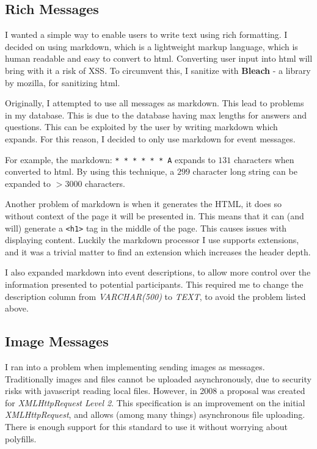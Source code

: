 \documentclass[a4paper,oneside,12pt]{report}
\begin{document}
	\subsection{Rich Messages}
	I wanted a simple way to enable users to write text using rich formatting. I decided on using markdown, which is a lightweight markup language, which is human readable and easy to convert to html. Converting user input into html will bring with it a risk of XSS. To circumvent this, I sanitize with \textbf{Bleach} - a library by mozilla, for sanitizing html.


	Originally, I attempted to use all messages as markdown. This lead to problems in my database. This is due to the database having max lengths for answers and questions. This can be exploited by the user by writing markdown which expands. For this reason, I decided to only use markdown for event messages.

	\begin{framed}
		For example, the markdown: \verb+* * * * * * A+ expands to \(131\) characters when converted to html. By using this technique, a \(299\) character long string can be expanded to \(> 3000\) characters.
	\end{framed}

	\lstset{language=html}
	Another problem of markdown is when it generates the HTML, it does so without context of the page it will be presented in. This means that it can (and will) generate a \lstinline|<h1>| tag in the middle of the page. This causes issues with displaying content. Luckily the markdown processor I use supports extensions, and it was a trivial matter to find an extension which increases the header depth.

	I also expanded markdown into event descriptions, to allow more control over the information presented to potential participants. This required me to change the description column from  \textit{VARCHAR(500)} to \textit{TEXT}, to avoid the problem listed above.


	\subsection{Image Messages}
	I ran into a problem when implementing sending images as messages. Traditionally images and files cannot be uploaded asynchronously, due to security risks with javascript reading local files. However, in 2008 a proposal was created for \textit{XMLHttpRequest Level 2}. This specification is an improvement on the initial \textit{XMLHttpRequest}, and allows (among many things) asynchronous file uploading. There is enough support for this standard to use it without worrying about polyfills.
\end{document}
